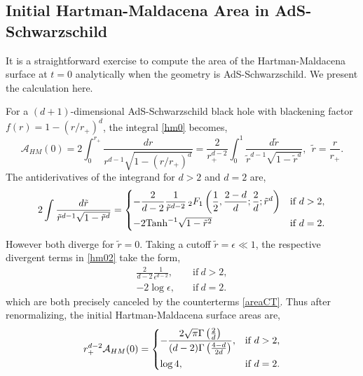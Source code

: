 \documentclass[12pt,a4paper]{article}
\begin{document}
\begin{appendices}
\section{Initial Hartman-Maldacena Area in AdS-Schwarzschild}\label{appC}

It is a straightforward exercise to compute the area of the Hartman-Maldacena surface at $t = 0$ analytically when the geometry is AdS-Schwarzschild. We present the calculation here.

For a $(d+1)$-dimensional AdS-Schwarzschild black hole with blackening factor $f(r) = 1-(r/r_+)^d$, the integral \eqref{hm0} becomes,
\begin{equation}
\mathcal{A}_{HM}(0) = 2\int_0^{r_+} \frac{dr}{r^{d-1}\sqrt{1 - (r/r_+)^d}} = \frac{2}{r_+^{d-2}} \int_0^1 \frac{d\tilde{r}}{\tilde{r}^{d-1}\sqrt{1-\tilde{r}^d}},\ \ \tilde{r} = \frac{r}{r_+}.\label{hm02}
\end{equation}
The antiderivatives of the integrand for $d > 2$ and $d = 2$ are,
\begin{equation}
2\int \frac{d\tilde{r}}{\tilde{r}^{d-1}\sqrt{1-\tilde{r}^d}} =
\begin{cases}
-\dfrac{2}{d-2}\dfrac{1}{\tilde{r}^{d-2}}\,_2F_1\left(\dfrac{1}{2},\dfrac{2-d}{d};\dfrac{2}{d};\tilde{r}^d\right)&\text{if}\ d > 2,\vspace{0.1cm}\\
-2\text{Tanh}^{-1}\sqrt{1-\tilde{r}^2}&\text{if}\ d = 2.
\end{cases}
\end{equation}
However both diverge for $\tilde{r} = 0$. Taking a cutoff $\tilde{r} = \epsilon \ll 1$, the respective divergent terms in \eqref{hm02} take the form,
\begin{align}
\frac{2}{d-2}\frac{1}{\epsilon^{d-2}},&\quad\text{if}\ d > 2,\\
-2\log\epsilon,&\quad\text{if}\ d = 2.
\end{align}
which are both precisely canceled by the counterterms \eqref{areaCT}. Thus after renormalizing, the initial Hartman-Maldacena surface areas are,
\begin{equation}
r_+^{d-2} \mathcal{A}_{HM}(0)
= \begin{cases}
-\dfrac{2\sqrt{\pi}\Gamma\left(\frac{2}{d}\right)}{(d-2)\Gamma\left(\frac{4-d}{2d}\right)},&\text{if}\ d > 2,\vspace{0.1cm}\\
\log 4,&\text{if}\ d = 2.
\end{cases}
\end{equation}

\end{appendices}




\end{document}
